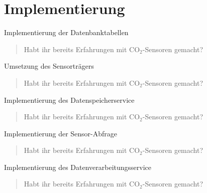 \documentclass[10pt,ngerman]{beamer}
\begin{document}
\section{Implementierung}
\begin{frame}[fragile]{Implementierung der Datenbanktabellen}
  \begin{minipage}[t]{1\textwidth}
    \begin{quotation}
      Habt ihr bereits Erfahrungen mit CO$_2$-Sensoren gemacht?
    \end{quotation}
  \end{minipage}
\end{frame}


\begin{frame}[fragile]{Umsetzung des Sensorträgers}
  \begin{minipage}[t]{1\textwidth}
    \begin{quotation}
      Habt ihr bereits Erfahrungen mit CO$_2$-Sensoren gemacht?
    \end{quotation}
  \end{minipage}
\end{frame}


\begin{frame}[fragile]{Implementierung des Datenspeicherservice}
  \begin{minipage}[t]{1\textwidth}
    \begin{quotation}
      Habt ihr bereits Erfahrungen mit CO$_2$-Sensoren gemacht?
    \end{quotation}
  \end{minipage}
\end{frame}


\begin{frame}[fragile]{Implementierung der Sensor-Abfrage}
  \begin{minipage}[t]{1\textwidth}
    \begin{quotation}
      Habt ihr bereits Erfahrungen mit CO$_2$-Sensoren gemacht?
    \end{quotation}
  \end{minipage}
\end{frame}


\begin{frame}[fragile]{Implementierung des Datenverarbeitungsservice}
  \begin{minipage}[t]{1\textwidth}
    \begin{quotation}
      Habt ihr bereits Erfahrungen mit CO$_2$-Sensoren gemacht?
    \end{quotation}
  \end{minipage}
\end{frame}
\end{document}

